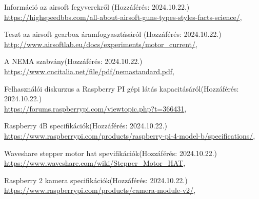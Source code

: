 \documentclass[12pt,a4paper]{article}
\begin{document}
\begin{thebibliography}{}
	
	Információ az airsoft fegyverekről \hfill (Hozzáférés: 2024.10.22.) \\
	{\footnotesize \url{https://highspeedbbs.com/all-about-airsoft-guns-types-styles-facts-science/}},

	
	Teszt az airsoft gearbox áramfogyasztásáról \hfill (Hozzáférés: 2024.10.22.) \\
	{\footnotesize \url{http://www.airsoftlab.eu/docs/experiments/motor_current/}},
	
	
	A NEMA szabvány\hfill (Hozzáférés: 2024.10.22.) \\
	{\footnotesize \url{https://www.cncitalia.net/file/pdf/nemastandard.pdf}},
	
	Felhasználói diskurzus a Raspberry PI gépi látás kapacitásáról\hfill (Hozzáférés: 2024.10.22.) \\
	{\footnotesize \url{https://forums.raspberrypi.com/viewtopic.php?t=366431}},
	
	Raspberry 4B specifikációk\hfill (Hozzáférés: 2024.10.22.) \\
	{\footnotesize \url{https://www.raspberrypi.com/products/raspberry-pi-4-model-b/specifications/}},
	
	Waveshare stepper motor hat spevifikációk\hfill (Hozzáférés: 2024.10.22.) \\
	{\footnotesize \url{https://www.waveshare.com/wiki/Stepper_Motor_HAT}},

	Raspberry 2 kamera specifikációk\hfill (Hozzáférés: 2024.10.22.) \\
	{\footnotesize \url{https://www.raspberrypi.com/products/camera-module-v2/}},

\end{thebibliography}
\end{document}
